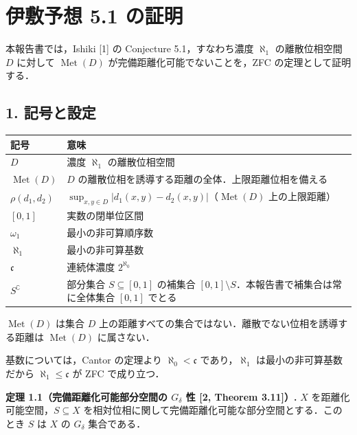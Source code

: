 \documentclass[
  lualatex,ja=standard]{bxjsarticle}
\author{}
\date{}
\begin{document}
\hypertarget{ux4f0aux6577ux4e88ux60f3-5.1-ux306eux8a3cux660e}{%
\section{伊敷予想 5.1
の証明}\label{ux4f0aux6577ux4e88ux60f3-5.1-ux306eux8a3cux660e}}

本報告書では，Ishiki {[}1{]} の Conjecture 5.1，すなわち濃度
\(\aleph_1\) の離散位相空間 \(D\) に対して \(\operatorname{Met}(D)\)
が完備距離化可能でないことを，ZFC の定理として証明する．

\hypertarget{ux8a18ux53f7ux3068ux8a2dux5b9a}{%
\subsection{1. 記号と設定}\label{ux8a18ux53f7ux3068ux8a2dux5b9a}}

\begin{longtable}[]{@{}
  >{\raggedright\arraybackslash}p{}
  >{\raggedright\arraybackslash}p{}@{}}
\toprule
記号 & 意味 \\
\midrule
\endhead
\(D\) & 濃度 \(\aleph_1\) の離散位相空間 \\
\(\operatorname{Met}(D)\) & \(D\)
の離散位相を誘導する距離の全体．上限距離位相を備える \\
\(\rho(d_1, d_2)\) &
\(\sup_{x,y\in D} \lvert d_1(x,y) - d_2(x,y)\rvert\)（\(\operatorname{Met}(D)\)
上の上限距離） \\
\([0,1]\) & 実数の閉単位区間 \\
\(\omega_1\) & 最小の非可算順序数 \\
\(\aleph_1\) & 最小の非可算基数 \\
\(\mathfrak{c}\) & 連続体濃度 \(2^{\aleph_0}\) \\
\(S^\complement\) & 部分集合 \(S \subseteq [0,1]\) の補集合
\([0,1] \setminus S\)．本報告書で補集合は常に全体集合 \([0,1]\)
でとる \\
\bottomrule
\end{longtable}

\(\operatorname{Met}(D)\) は集合 \(D\)
上の距離すべての集合ではない．離散でない位相を誘導する距離は
\(\operatorname{Met}(D)\) に属さない．

基数については，Cantor の定理より \(\aleph_0 < \mathfrak{c}\)
であり，\(\aleph_1\) は最小の非可算基数だから
\(\aleph_1 \le \mathfrak{c}\) が ZFC で成り立つ．

\textbf{定理 1.1（完備距離化可能部分空間の \(G_\delta\) 性 {[}2, Theorem
3.11{]}）.} \(X\) を距離化可能空間，\(S \subseteq X\)
を相対位相に関して完備距離化可能な部分空間とする．このとき \(S\) は
\(X\) の \(G_\delta\) 集合である．
\end{document}
